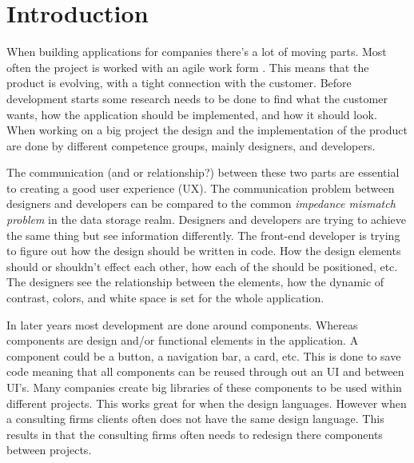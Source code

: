 \section{Introduction}




When building applications for companies there's a lot of moving parts. Most often the project is worked with an agile work form \cite{cohen2004introduction}. This means that the product is evolving, with a tight connection with the customer. Before development starts some research needs to be done to find what the customer wants, how the application should be implemented, and how it should look. When working on a big project the design and the implementation of the product are done by different competence groups, mainly designers, and developers. 

The communication (and or relationship?) between these two parts are essential to creating a good user experience (UX). The communication problem between designers and developers can be compared to the common \textit{impedance mismatch problem} in the data storage realm. Designers and developers are trying to achieve the same thing but see information differently. The front-end developer is trying to figure out how the design should be written in code. How the design elements should or shouldn't effect each other, how each of the should be positioned, etc. The designers see the relationship between the elements, how the dynamic of contrast, colors, and white space is set for the whole application. 

In later years most development are done around components. Whereas components are design and/or functional elements in the application. A component could be a button, a navigation bar, a card\cite{babichSimpleDesignTips2020}, etc. This is done to save code meaning that all components can be reused through out an UI and between UI's. Many companies create big libraries of these components to be used within different projects. This works great for when the design languages. However when a consulting firms clients often does not have the same design language. This results in that the consulting firms often needs to redesign there components between projects. 



